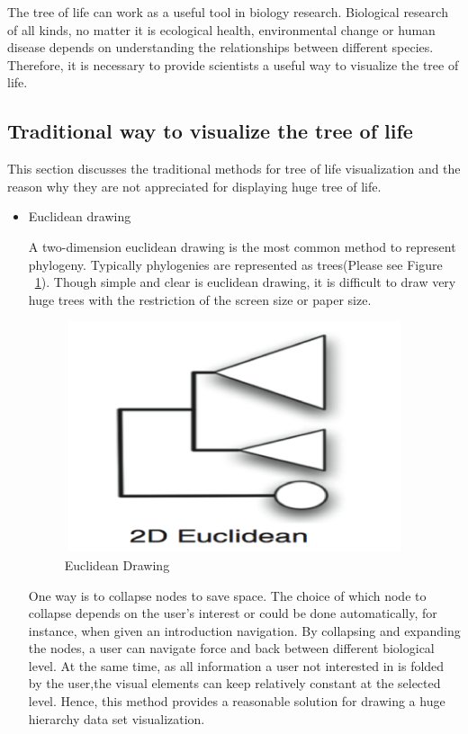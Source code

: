 \documentclass[a4paper,11pt,twoside]{report}
\begin{document}
The tree of life can work as a useful tool in biology research. Biological research of all kinds, no matter it is ecological health, environmental change or human disease depends on understanding the relationships between different species.\cite{treeOfLifeDefine} Therefore, it is necessary to provide scientists a useful way to visualize the tree of life.

\subsection{Traditional way to visualize the tree of life}

This section discusses the traditional methods for tree of life visualization and the reason why they are not appreciated for displaying huge tree of life.

\begin{itemize}
  \item Euclidean drawing
 
 A two-dimension euclidean drawing is the most common method to represent phylogeny. Typically phylogenies are represented as trees(Please see Figure ~\ref{fig:eucdeanDrawing}). Though simple and clear is euclidean drawing, it is difficult to draw very huge trees with the restriction of the screen size or paper size.
  
\begin{figure}[H]
  \centering
  \includegraphics [width=10cm,height=6.8cm]{EuclideanDrawing}
  \caption{Euclidean Drawing}
  \label{fig:eucdeanDrawing}
\end{figure}
  
  One way is to collapse nodes to save space. The choice of which node to collapse depends on the user's interest or could be done automatically, for instance, when given an introduction navigation.\cite{euclidean} By collapsing and expanding the nodes, a user can navigate force and back between different biological level. At the same time, as all information a user not interested in is folded by the user,the visual elements can keep relatively constant at the selected level. Hence, this method provides a reasonable solution for drawing a huge hierarchy data set visualization.
  

\end{itemize}
\end{document}
